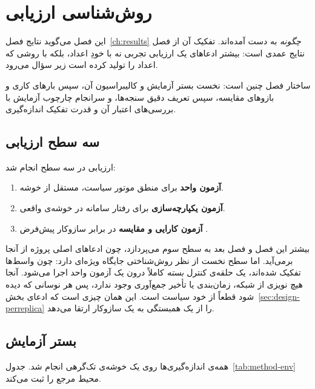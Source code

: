 \chapter{روش‌شناسی ارزیابی}
\label{ch:method}

این فصل می‌گوید نتایج فصل~\ref{ch:results} \emph{چگونه} به دست آمده‌اند. تفکیک آن از فصل
نتایج عمدی است: بیشتر ادعاهای یک ارزیابی تجربی نه با خودِ اعداد، بلکه با روشی که اعداد را
تولید کرده است زیر سؤال می‌رود.

ساختار فصل چنین است: نخست بستر آزمایش و کالیبراسیون آن، سپس بارهای کاری و بازوهای مقایسه،
سپس تعریف دقیق سنجه‌ها، و سرانجام چارچوب آزمایش با بررسی‌های اعتبار آن و قدرت تفکیک
اندازه‌گیری.

\section{سه سطح ارزیابی}
\label{sec:method-levels}

ارزیابی در سه سطح انجام شد:

\begin{enumerate}
  \item \textbf{آزمون واحد} برای منطق موتور سیاست، مستقل از خوشه.
  \item \textbf{آزمون یکپارچه‌سازی} برای رفتار سامانه در خوشه‌ی واقعی.
  \item \textbf{آزمون کارایی و مقایسه} در برابر سازوکار پیش‌فرض .
\end{enumerate}

بیشتر این فصل و فصل بعد به سطح سوم می‌پردازد، چون ادعاهای اصلی پروژه از آنجا برمی‌آید. اما
سطح نخست از نظر روش‌شناختی جایگاه ویژه‌ای دارد: چون واسط‌ها تفکیک شده‌اند، یک حلقه‌ی کنترل
\emph{بسته} کاملاً درون یک آزمون واحد اجرا می‌شود. آنجا هیچ نویزی از شبکه، زمان‌بندی یا
تأخیر جمع‌آوری وجود ندارد، پس هر نوسانی که دیده شود قطعاً از خود سیاست است. این همان چیزی
است که ادعای بخش~\ref{sec:design-perreplica} را از یک همبستگی به یک سازوکار ارتقا می‌دهد.

\section{بستر آزمایش}
\label{sec:method-testbed}

همه‌ی اندازه‌گیری‌ها روی یک خوشه‌ی تک‌گرهی  انجام شد. جدول~\ref{tab:method-env}
محیط مرجع را ثبت می‌کند.

